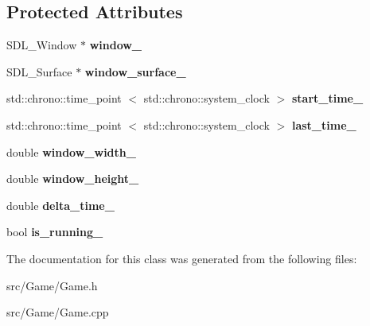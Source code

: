 \subsection*{\-Protected \-Attributes}
\begin{DoxyCompactItemize}
\item 
\hypertarget{classGame_a455ed3a9c691f291e46e121274c7f78c}{\-S\-D\-L\-\_\-\-Window $\ast$ {\bfseries window\-\_\-}}\label{classGame_a455ed3a9c691f291e46e121274c7f78c}

\item 
\hypertarget{classGame_a7a8e6cf22374bf4075ed0dbefe162d09}{\-S\-D\-L\-\_\-\-Surface $\ast$ {\bfseries window\-\_\-surface\-\_\-}}\label{classGame_a7a8e6cf22374bf4075ed0dbefe162d09}

\item 
\hypertarget{classGame_a72d724b2da38b37cbcb375d5ed958955}{std\-::chrono\-::time\-\_\-point\*
$<$ std\-::chrono\-::system\-\_\-clock $>$ {\bfseries start\-\_\-time\-\_\-}}\label{classGame_a72d724b2da38b37cbcb375d5ed958955}

\item 
\hypertarget{classGame_af1bba30e3b8d724d876f5583fb57b77d}{std\-::chrono\-::time\-\_\-point\*
$<$ std\-::chrono\-::system\-\_\-clock $>$ {\bfseries last\-\_\-time\-\_\-}}\label{classGame_af1bba30e3b8d724d876f5583fb57b77d}

\item 
\hypertarget{classGame_adfc72738ce39b3b64c74bfc73d8c665c}{double {\bfseries window\-\_\-width\-\_\-}}\label{classGame_adfc72738ce39b3b64c74bfc73d8c665c}

\item 
\hypertarget{classGame_a91a1bec556253ee2634e1cbdaac6d644}{double {\bfseries window\-\_\-height\-\_\-}}\label{classGame_a91a1bec556253ee2634e1cbdaac6d644}

\item 
\hypertarget{classGame_ae405818a55a8865c649b516b39d0fa1e}{double {\bfseries delta\-\_\-time\-\_\-}}\label{classGame_ae405818a55a8865c649b516b39d0fa1e}

\item 
\hypertarget{classGame_a80a68cd9fb4f944a7fdd97ea16e7cfd8}{bool {\bfseries is\-\_\-running\-\_\-}}\label{classGame_a80a68cd9fb4f944a7fdd97ea16e7cfd8}

\end{DoxyCompactItemize}


\-The documentation for this class was generated from the following files\-:\begin{DoxyCompactItemize}
\item 
src/\-Game/\-Game.\-h\item 
src/\-Game/\-Game.\-cpp\end{DoxyCompactItemize}
